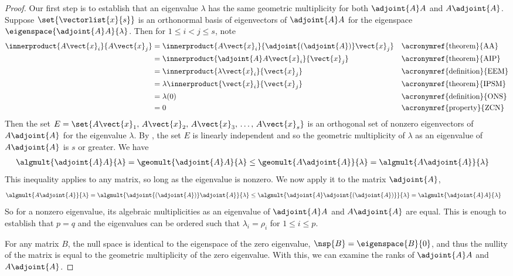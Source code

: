 \begin{proof}
%
Our first step is to establish that an eigenvalue $\lambda$ has the same geometric multiplicity for both $\adjoint{A}A$ and $A\adjoint{A}$.   Suppose $\set{\vectorlist{x}{s}}$ is an orthonormal basis of eigenvectors of $\adjoint{A}A$ for the eigenspace $\eigenspace{\adjoint{A}A}{\lambda}$.  Then for $1\leq i<j\leq s$, note
%
\begin{align*}
\innerproduct{A\vect{x}_i}{A\vect{x}_j}
&=\innerproduct{A\vect{x}_i}{\adjoint{\left(\adjoint{A}\right)}\vect{x}_j}
&&\text{\acronymref{theorem}{AA}}\\
%
&=\innerproduct{\adjoint{A}A\vect{x}_i}{\vect{x}_j}
&&\text{\acronymref{theorem}{AIP}}\\
%
&=\innerproduct{\lambda\vect{x}_i}{\vect{x}_j}
&&\text{\acronymref{definition}{EEM}}\\
%
&=\lambda\innerproduct{\vect{x}_i}{\vect{x}_j}
&&\text{\acronymref{theorem}{IPSM}}\\
%
&=\lambda(0)
&&\text{\acronymref{definition}{ONS}}\\
%
&=0
&&\text{\acronymref{property}{ZCN}}
%
\end{align*}
%
Then the set $E=\set{A\vect{x}_1,\,A\vect{x}_2,\,A\vect{x}_3,\,\dots,\,A\vect{x}_s}$ is an orthogonal set of nonzero eigenvectors of $A\adjoint{A}$ for the eigenvalue $\lambda$.  By , the set $E$ is linearly independent and so the geometric multiplicity of $\lambda$ as an eigenvalue of $A\adjoint{A}$ is $s$ or greater.  We have
%
\begin{align*}
\algmult{\adjoint{A}A}{\lambda}
&=\geomult{\adjoint{A}A}{\lambda}
\leq\geomult{A\adjoint{A}}{\lambda}
=\algmult{A\adjoint{A}}{\lambda}
\end{align*}
%
This inequality applies to any matrix, so long as the eigenvalue is nonzero.  We now apply it to the matrix $\adjoint{A}$,
%
\begin{align*}
\algmult{A\adjoint{A}}{\lambda}
&=\algmult{\adjoint{\left(\adjoint{A}\right)}\adjoint{A}}{\lambda}
\leq \algmult{\adjoint{A}\adjoint{\left(\adjoint{A}\right)}}{\lambda}
=\algmult{\adjoint{A}A}{\lambda}
\end{align*}
%
So for a nonzero eigenvalue, its algebraic multiplicities as an eigenvalue of $\adjoint{A}A$ and $A\adjoint{A}$ are equal.  This is enough to establish that $p=q$ and the eigenvalues can be ordered such that $\lambda_i=\rho_i$ for $1\leq i\leq p$.\par
%
For any matrix $B$, the null space is identical to the eigenspace of the zero eigenvalue, $\nsp{B}=\eigenspace{B}{0}$, and thus the nullity of the matrix is equal to the geometric multiplicity of the zero eigenvalue.  With this, we can examine the ranks of $\adjoint{A}A$ and $A\adjoint{A}$.

\end{proof}
